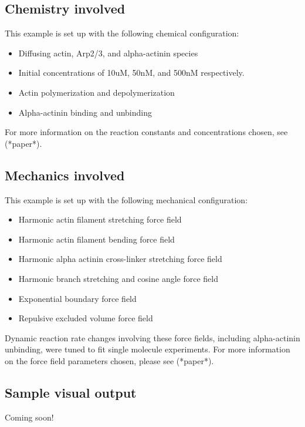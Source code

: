 \documentclass[11pt, oneside]{article}   	%
\begin{document}
\subsection{Chemistry involved}

This example is set up with the following chemical configuration:

\begin{itemize}
\item Diffusing actin, Arp2/3, and alpha-actinin species
\item Initial concentrations of 10uM, 50nM, and 500nM respectively.
\item Actin polymerization and depolymerization
\item Alpha-actinin binding and unbinding

\end{itemize}

\noindent For more information on the reaction constants and concentrations chosen, see (*paper*).

\subsection{Mechanics involved}

This example is set up with the following mechanical configuration:

\begin{itemize}
\item Harmonic actin filament stretching force field
\item Harmonic actin filament bending force field
\item Harmonic alpha actinin cross-linker stretching force field
\item Harmonic branch stretching and cosine angle force field
\item Exponential boundary force field
\item Repulsive excluded volume force field
\end{itemize}

\noindent Dynamic reaction rate changes involving these force fields, including alpha-actinin unbinding, were tuned to fit single molecule experiments.\newline\newline
\noindent For more information on the force field parameters chosen, please see (*paper*). 


\subsection{Sample visual output}

Coming soon!
\end{document}
